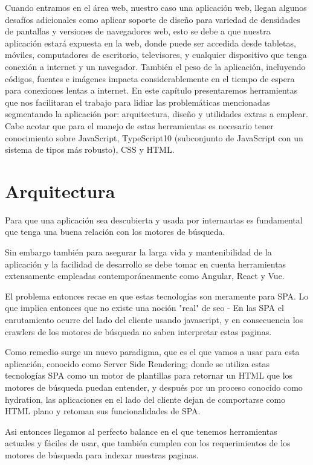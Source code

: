 Cuando entramos en el área web, nuestro caso una aplicación web, llegan algunos desafíos adicionales como aplicar soporte de diseño para variedad de densidades de pantallas y versiones de navegadores web, esto se debe a que nuestra aplicación estará expuesta en la web, donde puede ser accedida desde tabletas, móviles, computadores de escritorio, televisores, y cualquier dispositivo que tenga conexión a internet y un navegador. También el peso de la aplicación, incluyendo códigos, fuentes e imágenes impacta considerablemente en el tiempo de espera para conexiones lentas a internet. En este capítulo presentaremos herramientas que nos facilitaran el trabajo para lidiar las problemáticas mencionadas segmentando la aplicación por: arquitectura, diseño y utilidades extras a emplear. Cabe acotar que para el manejo de estas herramientas es necesario tener conocimiento sobre JavaScript, TypeScript10 (subconjunto de JavaScript con un sistema de tipos más robusto), CSS y HTML.


\section{Arquitectura}

Para que una aplicación sea descubierta y usada por internautas es fundamental que tenga una buena relación con los motores de búsqueda.

Sin embargo también para asegurar la larga vida y mantenibilidad de la aplicación y la facilidad de desarrollo se debe tomar en cuenta herramientas extensamente empleadas contemporáneamente como Angular, React y Vue.

El problema entonces recae en que estas tecnologías son meramente para SPA. Lo que implica entonces que no existe una noción "real" de seo - En las SPA el enrutamiento ocurre del lado del cliente usando javascript, y en consecuencia los crawlers de los motores de búsqueda no saben interpretar estas paginas.

Como remedio surge un nuevo paradigma, que es el que vamos a usar para esta aplicación, conocido como Server Side Rendering; donde se utiliza estas tecnologías SPA como un motor de plantillas para retornar un HTML que los motores de búsqueda puedan entender, y después por un proceso conocido como hydration, las aplicaciones en el lado del cliente dejan de comportarse como HTML plano y retoman sus funcionalidades de SPA.

Asi entonces llegamos al perfecto balance en el que tenemos herramientas actuales y fáciles de usar, que también cumplen con los requerimientos de los motores de búsqueda para indexar nuestras paginas.


